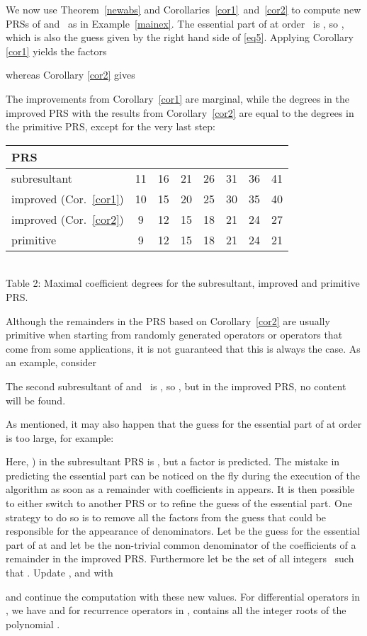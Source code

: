 \documentclass[3p,11pt,preprint]{elsarticle}
\begin{document}
\begin{example}
 We now use Theorem~\ref{newabs} and Corollaries~\ref{cor1}~and~\ref{cor2} to compute new PRSs of  and~ as in Example~\ref{mainex}. The essential part of  at order~ is , so , which is also the guess given by the right hand side of \eqref{eq5}. Applying Corollary \ref{cor1} yields the factors

whereas Corollary \ref{cor2} gives

 The improvements from Corollary~\ref{cor1}  are marginal, while the degrees in the improved PRS with the results from Corollary~\ref{cor2} are equal to the degrees in the primitive PRS, except for the very last step:
 \begin{center}
\begin{tabular}{l|c|c|c|c|c|c|c}
PRS &  &  &  &  &  &  & \\
\hline
 subresultant & 11 & 16 & 21 & 26 & 31 & 36 & 41\\
\hline
 improved (Cor.~\ref{cor1}) & 10 & 15 & 20 & 25 & 30 & 35 & 40\\
\hline
 improved (Cor.~\ref{cor2})& 9 & 12 & 15 & 18 & 21 & 24 & 27\\
\hline
 primitive & 9 & 12 & 15 & 18 & 21 & 24 & 21\\
\end{tabular}\\
\vspace{0.1cm}\scriptsize{Table 2: Maximal coefficient degrees for the subresultant, improved and primitive PRS.}
\end{center}
\end{example}

\begin{example}
 Although the remainders in the PRS based on Corollary~\ref{cor2} are usually primitive when starting from randomly generated operators or operators that come from some applications, it is not guaranteed that this is always the case. As an example, consider 

The second subresultant of  and~ is , so , but in the improved PRS, no content will be found. 

As mentioned, it may also happen that the guess for the essential part of  at order  is too large, for example:

Here, ) in the subresultant PRS is , but a factor  is predicted. The mistake in predicting the essential part can be noticed on the fly during the execution of the algorithm as soon as a remainder with coefficients in  appears. It is then possible to either switch to another PRS or to refine the guess of the essential part. One strategy to do so is to remove all the factors from the guess that could be responsible for the appearance of denominators. Let  be the guess for the essential part of  at  and let  be the non-trivial common denominator of the coefficients of a remainder  in the improved PRS. Furthermore let  be the set of all integers~ such that . Update ,  and  with

and continue the computation with these new values. For differential operators in , we have  and for recurrence operators in ,  contains all the integer roots of the polynomial .
\end{example}
\end{document}

